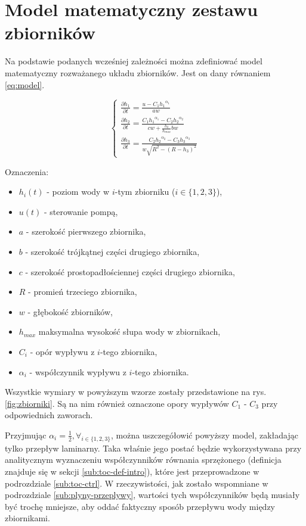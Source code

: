 \section{Model matematyczny zestawu zbiorników}
\label{sec:model}

Na podstawie podanych wcześniej zależności można zdefiniować model matematyczny rozważanego układu zbiorników.
Jest on dany równaniem \ref{eq:model}.

\begin{equation}\label{eq:model}
\left \{
\begin{array}{lr}
\frac{\partial h_{1}}{\partial t} = \frac{u - C_{1}{h_{1}}^{\alpha_{1}}}{aw} \\[8pt]
\frac{\partial h_{2}}{\partial t} = \frac{C_{1}{h_{1}}^{\alpha_{1}} -  C_{2}{h_{2}}^{\alpha_{2}}}{cw + \frac{h_{2}}{h_{max}}bw} \\[20pt]
\frac{\partial h_{3}}{\partial t} = \frac{C_{2}{h_{2}}^{\alpha_{2}} -  C_{3}{h_{3}}^{\alpha_{3}}}{w\sqrt{R^{2} - (R - h_{3})^{2}}}
\end{array}
\right.
\end{equation}

Oznaczenia:
\begin{itemize}
    \item $h_{i}(t)$ - poziom wody w $i$-tym zbiorniku ($i \in \{1, 2, 3\}$),
    \item $u(t)$ - sterowanie pompą,
    \item $a$ - szerokość pierwszego zbiornika,
    \item $b$ - szerokość trójkątnej części drugiego zbiornika,
    \item $c$ - szerokość prostopadłościennej części drugiego zbiornika,
    \item $R$ - promień trzeciego zbiornika,
    \item $w$ - głębokość zbiorników,
    \item $h_{max}$ maksymalna wysokość słupa wody w zbiornikach,
    \item $C_{i}$ - opór wypływu z $i$-tego zbiornika,
    \item $\alpha_{i}$ - współczynnik wypływu z $i$-tego zbiornika.
\end{itemize}

Wszystkie wymiary w powyższym wzorze zostały przedstawione na rys. \ref{fig:zbiorniki}. Są na nim również oznaczone opory wypływów $C_{1}$ - $C_{3}$ przy odpowiednich zaworach.

Przyjmując $\alpha_{i} = \frac{1}{2}, \forall_{i \in \{1, 2, 3\}}$, można uszczegółowić powyższy model, zakładając tylko przepływ laminarny.
Taka właśnie jego postać będzie wykorzystywana przy analitycznym wyznaczeniu współczynników równania sprzężonego (definicja znajduje się w sekcji \ref{sub:toc-def-intro}), które jest przeprowadzone w podrozdziale \ref{sub:toc-ctrl}.
W rzeczywistości, jak zostało wspomniane w podrozdziale \ref{sub:plyny-przeplywy}, wartości tych współczynników będą musiały być trochę mniejsze, aby oddać faktyczny sposób przepływu wody między zbiornikami.

